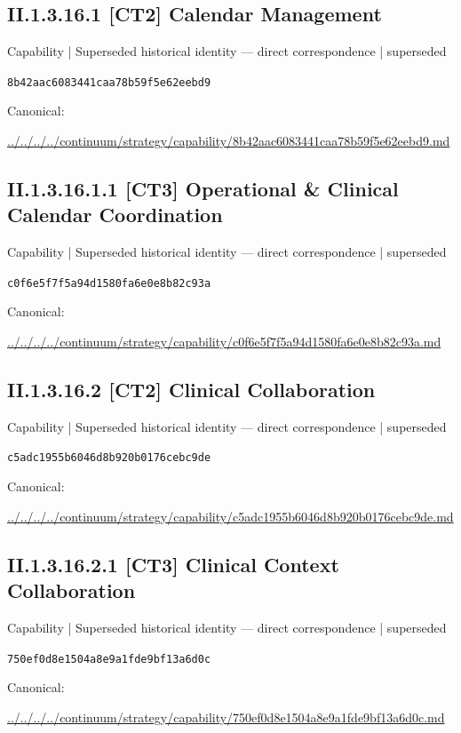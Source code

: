 \documentclass[10pt,a4paper]{article}
\begin{document}
\subsection*{II.1.3.16.1 [CT2] Calendar Management}
{\small Capability | Superseded historical identity — direct correspondence | superseded}\par
\texttt{8b42aac6083441caa78b59f5e62eebd9}\par
Canonical: \par
{\footnotesize\url{../../../../continuum/strategy/capability/8b42aac6083441caa78b59f5e62eebd9.md}}\par
\subsection*{II.1.3.16.1.1 [CT3] Operational \& Clinical Calendar Coordination}
{\small Capability | Superseded historical identity — direct correspondence | superseded}\par
\texttt{c0f6e5f7f5a94d1580fa6e0e8b82c93a}\par
Canonical: \par
{\footnotesize\url{../../../../continuum/strategy/capability/c0f6e5f7f5a94d1580fa6e0e8b82c93a.md}}\par
\subsection*{II.1.3.16.2 [CT2] Clinical Collaboration}
{\small Capability | Superseded historical identity — direct correspondence | superseded}\par
\texttt{c5adc1955b6046d8b920b0176cebc9de}\par
Canonical: \par
{\footnotesize\url{../../../../continuum/strategy/capability/c5adc1955b6046d8b920b0176cebc9de.md}}\par
\subsection*{II.1.3.16.2.1 [CT3] Clinical Context Collaboration}
{\small Capability | Superseded historical identity — direct correspondence | superseded}\par
\texttt{750ef0d8e1504a8e9a1fde9bf13a6d0c}\par
Canonical: \par
{\footnotesize\url{../../../../continuum/strategy/capability/750ef0d8e1504a8e9a1fde9bf13a6d0c.md}}\par
\end{document}
